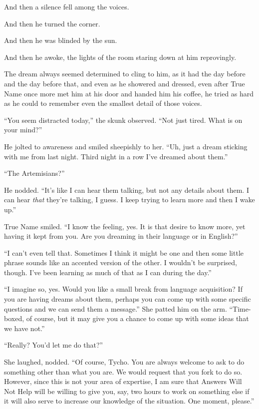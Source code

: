 And then a silence fell among the voices.

And then he turned the corner.

And then he was blinded by the sun.

And then he awoke, the lights of the room staring down at him reprovingly.

The dream always seemed determined to cling to him, as it had the day before and the day before that, and even as he showered and dressed, even after True Name once more met him at his door and handed him his coffee, he tried as hard as he could to remember even the smallest detail of those voices.

``You seem distracted today,'' the skunk observed. ``Not just tired. What is on your mind?''

He jolted to awareness and smiled sheepishly to her. ``Uh, just a dream sticking with me from last night. Third night in a row I've dreamed about them.''

``The Artemisians?''

He nodded. ``It's like I can hear them talking, but not any details about them. I can hear \emph{that} they're talking, I guess. I keep trying to learn more and then I wake up.''

True Name smiled. ``I know the feeling, yes. It is that desire to know more, yet having it kept from you. Are you dreaming in their language or in English?''

``I can't even tell that. Sometimes I think it might be one and then some little phrase sounds like an accented version of the other. I wouldn't be surprised, though. I've been learning as much of that as I can during the day.''

``I imagine so, yes. Would you like a small break from language acquisition? If you are having dreams about them, perhaps you can come up with some specific questions and we can send them a message.'' She patted him on the arm. ``Time-boxed, of course, but it may give you a chance to come up with some ideas that we have not.''

``Really? You'd let me do that?''

She laughed, nodded. ``Of course, Tycho. You are always welcome to ask to do something other than what you are. We would request that you fork to do so. However, since this is not your area of expertise, I am sure that Answers Will Not Help will be willing to give you, say, two hours to work on something else if it will also serve to increase our knowledge of the situation. One moment, please.''

